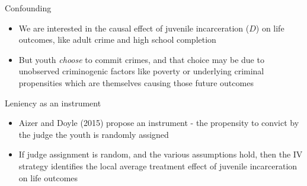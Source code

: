 \documentclass{beamer}
\begin{document}
\begin{frame}{Confounding}


		\begin{center}
		\end{center}
		
		\begin{itemize}
		\item We are interested in the causal effect of juvenile incarceration ($D$) on life outcomes, like adult crime and high school completion
		\item But youth \emph{choose} to commit crimes, and that choice may be due to unobserved criminogenic factors like poverty or underlying criminal propensities which are themselves causing those future outcomes
		\end{itemize}
		

\end{frame}

\begin{frame}{Leniency as an instrument}

		\begin{center}
		\end{center}
		
		\begin{itemize}
		\item Aizer and Doyle (2015) propose an instrument - the propensity to convict by the judge the youth is randomly assigned
		\item If judge assignment is random, and the various assumptions hold, then the IV strategy identifies the local average treatment effect of juvenile incarceration on life outcomes
		\end{itemize}

\end{frame}
\end{document}
